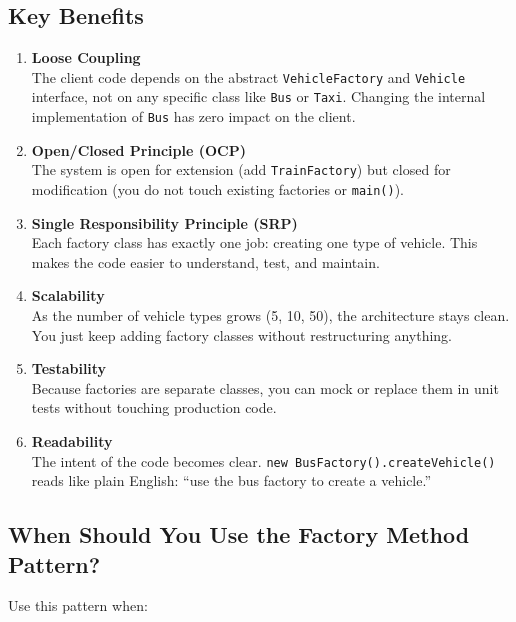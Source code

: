 \documentclass[12pt, a4paper]{article}
\begin{document}
\subsection{Key Benefits}

\begin{enumerate}[leftmargin=*, label=\textbf{\arabic*.}]
    \item \textbf{Loose Coupling} \\
    The client code depends on the abstract \texttt{VehicleFactory} and \texttt{Vehicle} interface, not on any specific class like \texttt{Bus} or \texttt{Taxi}. Changing the internal implementation of \texttt{Bus} has zero impact on the client.

    \item \textbf{Open/Closed Principle (OCP)} \\
    The system is open for extension (add \texttt{TrainFactory}) but closed for modification (you do not touch existing factories or \texttt{main()}).

    \item \textbf{Single Responsibility Principle (SRP)} \\
    Each factory class has exactly one job: creating one type of vehicle. This makes the code easier to understand, test, and maintain.

    \item \textbf{Scalability} \\
    As the number of vehicle types grows (5, 10, 50), the architecture stays clean. You just keep adding factory classes without restructuring anything.

    \item \textbf{Testability} \\
    Because factories are separate classes, you can mock or replace them in unit tests without touching production code.

    \item \textbf{Readability} \\
    The intent of the code becomes clear. \texttt{new BusFactory().createVehicle()} reads like plain English: ``use the bus factory to create a vehicle.''
\end{enumerate}

\subsection{When Should You Use the Factory Method Pattern?}

Use this pattern when:
\end{document}
